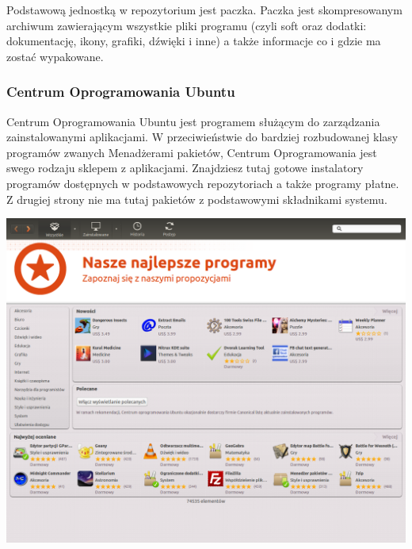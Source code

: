 Podstawową jednostką w repozytorium jest paczka. Paczka jest skompresowanym archiwum zawierającym wszystkie pliki programu (czyli soft oraz dodatki: dokumentację, ikony, grafiki, dźwięki i inne) a także informacje co i gdzie ma zostać wypakowane.

\subsubsection{Centrum Oprogramowania Ubuntu}
\textcolor{ubuntu_orange}{Centrum Oprogramowania Ubuntu} jest programem służącym do zarządzania zainstalowanymi aplikacjami. W przeciwieństwie do bardziej rozbudowanej klasy programów zwanych Menadżerami pakietów, Centrum Oprogramowania jest swego rodzaju sklepem z aplikacjami. Znajdziesz tutaj gotowe instalatory programów dostępnych w podstawowych repozytoriach a także programy płatne. Z drugiej strony nie ma tutaj pakietów z podstawowymi składnikami systemu.

\begin{center}
	\includegraphics[width=\linewidth]{images/programy_centrum.png}
\end{center} 


